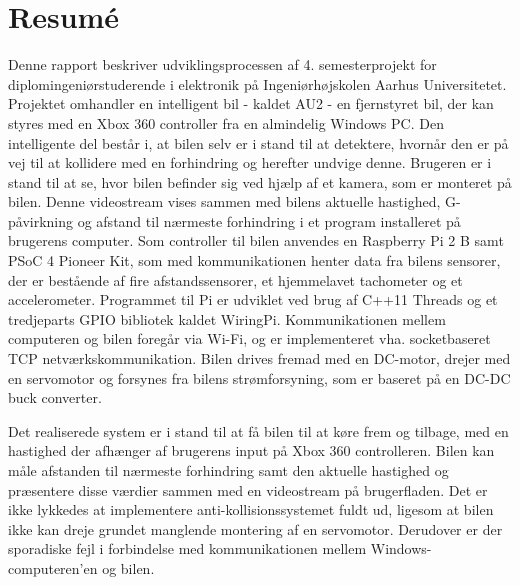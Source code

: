 \chapter{Resumé}
\label{ch:Resume}

Denne rapport beskriver udviklingsprocessen af 4. semesterprojekt for diplomingeniørstuderende i elektronik på Ingeniørhøjskolen Aarhus Universitetet. 
Projektet omhandler en intelligent bil - kaldet AU2 - en fjernstyret bil, der kan styres med en Xbox 360 controller\cite{lib:xbox-360} fra en almindelig Windows PC. 
Den intelligente del består i, at bilen selv er i stand til at detektere, hvornår den er på vej til at kollidere med en forhindring og herefter undvige denne. 
Brugeren er i stand til at se, hvor bilen befinder sig ved hjælp af et kamera\cite{lib:cam}, som er monteret på bilen. 
Denne videostream vises sammen med bilens aktuelle hastighed, G-påvirkning og  afstand til nærmeste forhindring i et program installeret på brugerens computer.
Som controller til bilen anvendes en Raspberry Pi 2 B\cite{lib:rpi} samt PSoC 4 Pioneer Kit\cite{lib:psoc4_guide}, som med \IIC kommunikationen henter data fra bilens sensorer, der er bestående af fire afstandssensorer\cite{lib:maxsonar}, et hjemmelavet tachometer og et accelerometer\cite{lib:accel}. 
Programmet til Pi er udviklet ved brug af C++11 Threads\cite{lib:std::Thread} og et tredjeparts GPIO bibliotek kaldet WiringPi\cite{lib:wiringpi}. 
Kommunikationen mellem computeren og bilen foregår via Wi-Fi, og er implementeret vha. socketbaseret TCP netværkskommunikation. 
Bilen drives fremad med en DC-motor, drejer med en servomotor og forsynes fra bilens strømforsyning, som er baseret på en DC-DC buck converter.

Det realiserede system er i stand til at få bilen til at køre frem og tilbage, med en hastighed der afhænger af brugerens input på Xbox 360 controlleren. Bilen kan måle afstanden til nærmeste forhindring samt den aktuelle hastighed og præsentere disse værdier sammen med en videostream på brugerfladen. Det er ikke lykkedes at implementere anti-kollisionssystemet fuldt ud, ligesom at bilen ikke kan dreje grundet manglende montering af en servomotor. Derudover er der sporadiske fejl i forbindelse med kommunikationen mellem Windows-computeren'en og bilen.
\clearpage